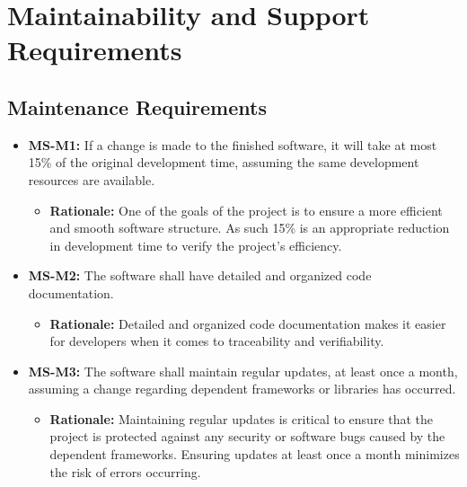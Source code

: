 \documentclass[12pt]{article}
\newcommand{\lips}{\textit{Insert your content here.}}
\begin{document}
\section{Maintainability and Support Requirements}
\subsection{Maintenance Requirements}

\begin{itemize}
  \item \textbf{MS-M1:} If a change is made to the finished software, it will take at most 15\% of the original development time, assuming the same development resources are available.
    \begin{itemize}
      \item \textbf{Rationale:} One of the goals of the project is to ensure a more efficient and smooth software structure. As such 15\% is an appropriate reduction in development time to verify the project’s efficiency. 
    \end{itemize}
  \item \textbf{MS-M2:} The software shall have detailed and organized code documentation.
  \begin{itemize}
    \item \textbf{Rationale:} Detailed and organized code documentation makes it easier for developers when it comes to traceability and verifiability. 
  \end{itemize}
  \item \textbf{MS-M3:} The software shall maintain regular updates, at least once a month, assuming a change regarding dependent frameworks or libraries has occurred. 
  \begin{itemize}
    \item \textbf{Rationale:} Maintaining regular updates is critical to ensure that the project is protected against any security or software bugs caused by the dependent frameworks. Ensuring updates at least once a month minimizes the risk of errors occurring. 
  \end{itemize}
\end{itemize}
\end{document}
